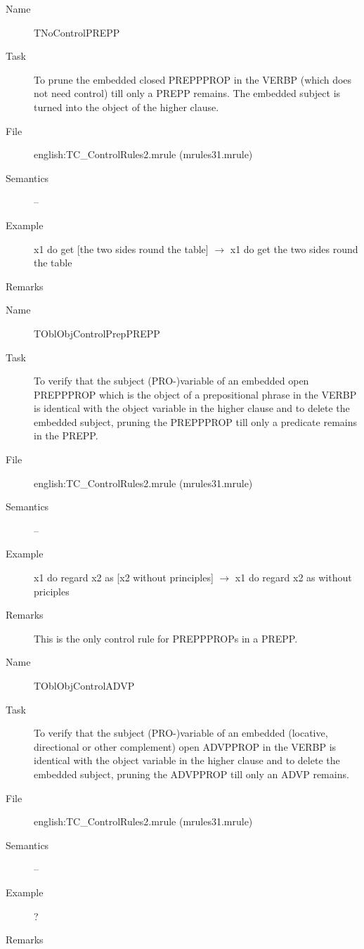 \begin{description}
\vspace{1 cm}
\begin{description}
\item[Name]   TNoControlPREPP
\item[Task] To prune the embedded closed PREPPPROP in the VERBP 
(which does not need control) 
till only a PREPP remains. The embedded subject is turned into the object 
of the higher clause.
\item[File] english:TC\_ControlRules2.mrule (mrules31.mrule)
\item[Semantics] --
\item[Example] x1 do get [the two sides round the table] $\rightarrow$ x1 do 
get the two sides round the table
\item[Remarks] 
\end{description}

\vspace{1 cm}
\begin{description}
\item[Name] TOblObjControlPrepPREPP
\item[Task] To verify that  the subject (PRO-)variable of an embedded 
open PREPPPROP which is the object of a prepositional phrase in the VERBP 
is identical with the object variable in the higher clause 
and to delete the embedded subject, pruning the PREPPPROP till only a predicate 
remains in the PREPP. 
\item[File] english:TC\_ControlRules2.mrule (mrules31.mrule)
\item[Semantics] --
\item[Example] x1 do regard x2 as [x2 without principles] $\rightarrow$ x1 do 
regard x2 as without priciples
\item[Remarks] This is the only control rule for PREPPPROPs in a PREPP.
\end{description}

\vspace{1 cm}
\begin{description}
\item[Name]   TOblObjControlADVP
\item[Task] To verify that  the subject (PRO-)variable of an embedded 
(locative, directional or other complement) open ADVPPROP in the VERBP is 
identical with the object variable in the higher clause 
and to delete the embedded subject, pruning the ADVPPROP till only an ADVP
remains. 
\item[File] english:TC\_ControlRules2.mrule (mrules31.mrule)
\item[Semantics] --
\item[Example] ?
\item[Remarks] 
\end{description}


\end{description}

